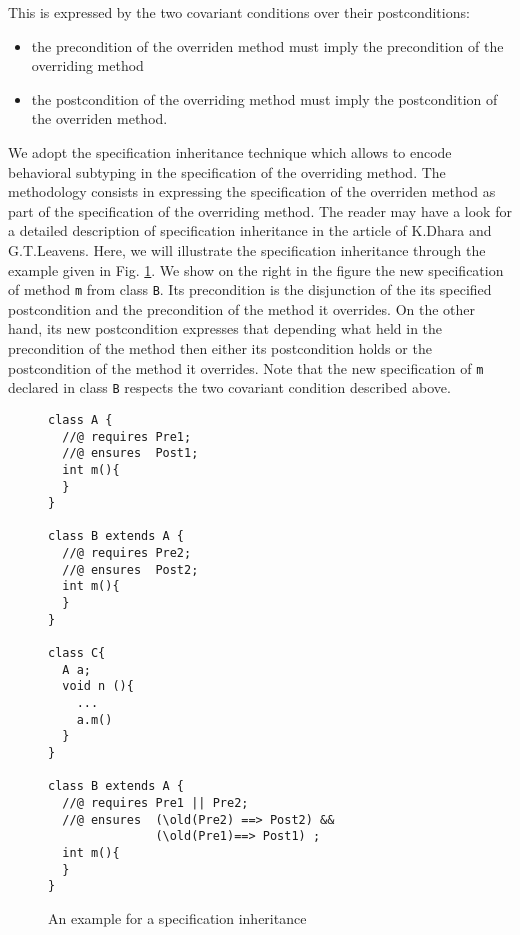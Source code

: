 \begin{description}
        This is expressed by the two covariant conditions over their postconditions:
	\begin{itemize}
	   \item the precondition of the  overriden method must  imply
	         the precondition of the overriding method 
	   \item the postcondition of the overriding method must imply 
	         the postcondition of the overriden method.
	\end{itemize}
	We adopt the specification inheritance technique which allows to encode behavioral subtyping in the specification of the 
	overriding method. The methodology consists in expressing the specification of the overriden method 
	as part of the specification of the overriding method. The reader may have a look for a detailed description of
	specification inheritance  in  the article \cite{Dhara-Leavens95} of K.Dhara and G.T.Leavens. Here, we will 
	illustrate the specification inheritance through the example given in Fig. \ref{assertLang:lang:inherit}. We show on the right in the figure
	the new specification of method  \lstinline!m!  from class \lstinline!B!. Its precondition is the disjunction of the its specified postcondition 
	and the precondition of the method it overrides. On the other hand, its new postcondition expresses that depending what held in the precondition 
	of the  method then either its postcondition holds or the postcondition of the method it overrides. Note that the new 
	specification of \lstinline!m!  declared in class \lstinline!B!  respects the two covariant condition described above.
	
	

\begin{figure}[ht!]
\begin{lstlisting}[frame=trbl]
class A {
  //@ requires Pre1;
  //@ ensures  Post1;
  int m(){
  }
}

class B extends A {
  //@ requires Pre2;
  //@ ensures  Post2;
  int m(){
  }
}

class C{
  A a;
  void n (){
    ...
    a.m()
  }
} 

class B extends A {
  //@ requires Pre1 || Pre2;
  //@ ensures  (\old(Pre2) ==> Post2) && 
               (\old(Pre1)==> Post1) ;
  int m(){
  }
}

\end{lstlisting}
 
 \caption{\sc An example for a specification inheritance} \label{assertLang:lang:inherit}
\end{figure}

\end{description}



